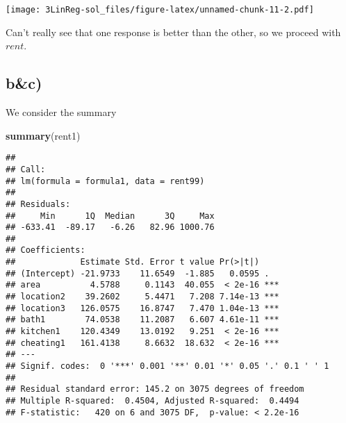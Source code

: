 \documentclass[]{article}
\newenvironment{Shaded}{\begin{snugshade}}{\end{snugshade}}
\newcommand{\KeywordTok}[1]{\textcolor[rgb]{0.13,0.29,0.53}{\textbf{#1}}}
\newcommand{\DataTypeTok}[1]{\textcolor[rgb]{0.13,0.29,0.53}{#1}}
\newcommand{\DecValTok}[1]{\textcolor[rgb]{0.00,0.00,0.81}{#1}}
\newcommand{\StringTok}[1]{\textcolor[rgb]{0.31,0.60,0.02}{#1}}
\newcommand{\OperatorTok}[1]{\textcolor[rgb]{0.81,0.36,0.00}{\textbf{#1}}}
\newcommand{\NormalTok}[1]{#1}
\begin{document}
\begin{Shaded}
\end{Shaded}

\texttt{[image: 3LinReg-sol\_files/figure-latex/unnamed-chunk-11-2.pdf]}

Can't really see that one response is better than the other, so we
proceed with \(rent\).

\subsection{b\&c)}\label{bc}

We consider the summary

\begin{Shaded}
\begin{Highlighting}[]
\KeywordTok{summary}\NormalTok{(rent1)}
\end{Highlighting}
\end{Shaded}

\begin{verbatim}
## 
## Call:
## lm(formula = formula1, data = rent99)
## 
## Residuals:
##     Min      1Q  Median      3Q     Max 
## -633.41  -89.17   -6.26   82.96 1000.76 
## 
## Coefficients:
##             Estimate Std. Error t value Pr(>|t|)    
## (Intercept) -21.9733    11.6549  -1.885   0.0595 .  
## area          4.5788     0.1143  40.055  < 2e-16 ***
## location2    39.2602     5.4471   7.208 7.14e-13 ***
## location3   126.0575    16.8747   7.470 1.04e-13 ***
## bath1        74.0538    11.2087   6.607 4.61e-11 ***
## kitchen1    120.4349    13.0192   9.251  < 2e-16 ***
## cheating1   161.4138     8.6632  18.632  < 2e-16 ***
## ---
## Signif. codes:  0 '***' 0.001 '**' 0.01 '*' 0.05 '.' 0.1 ' ' 1
## 
## Residual standard error: 145.2 on 3075 degrees of freedom
## Multiple R-squared:  0.4504, Adjusted R-squared:  0.4494 
## F-statistic:   420 on 6 and 3075 DF,  p-value: < 2.2e-16
\end{verbatim}
\end{document}
